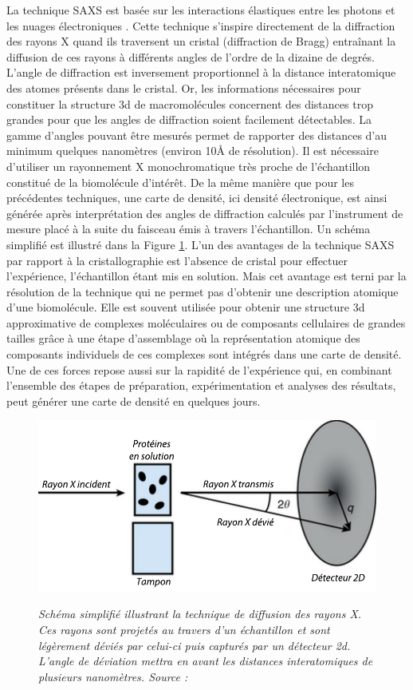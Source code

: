 La technique SAXS est basée sur les interactions élastiques entre les photons et les nuages électroniques \cite{guimer1955small}. Cette technique s'inspire directement de la diffraction des rayons X quand ils traversent un cristal (diffraction de Bragg) entraînant la diffusion de ces rayons à différents angles de l'ordre de la dizaine de degrés. L'angle de diffraction est inversement proportionnel à la distance interatomique des atomes présents dans le cristal. Or, les informations nécessaires pour constituer la structure 3d de macromolécules concernent des distances trop grandes pour que les angles de diffraction soient facilement détectables. La gamme d'angles pouvant être mesurés permet de rapporter des distances d'au minimum quelques nanomètres (environ 10\r{A} de résolution). Il est nécessaire d'utiliser un rayonnement X monochromatique très proche de l'échantillon constitué de la biomolécule d'intérêt. De la même manière que pour les précédentes techniques, une carte de densité, ici densité électronique, est ainsi générée après interprétation des angles de diffraction calculés par l'instrument de mesure placé à la suite du faisceau émis à travers l'échantillon. Un schéma simplifié est illustré dans la Figure \ref{Fig:saxs}.
L'un des avantages de la technique SAXS par rapport à la cristallographie est l'absence de cristal pour effectuer l'expérience, l'échantillon étant mis en solution. Mais cet avantage est terni par la résolution de la technique qui ne permet pas d'obtenir une description atomique d'une biomolécule. Elle est souvent utilisée pour obtenir une structure 3d approximative de complexes moléculaires ou de composants cellulaires de grandes tailles grâce à une étape d'assemblage où la représentation atomique des composants individuels de ces complexes sont intégrés dans une carte de densité. Une de ces forces repose aussi sur la rapidité de l'expérience qui, en combinant l'ensemble des étapes de préparation, expérimentation et analyses des résultats, peut générer une carte de densité en quelques jours.

\begin{figure}[htb]
  \centering
  {\includegraphics[width=0.75\linewidth]{./figures/ch1/saxs.pdf}}
    \caption[Schéma de la technique de diffusion des rayons X - SAXS.]{\it Schéma simplifié illustrant la technique de diffusion des rayons X. Ces rayons sont projetés au travers d'un échantillon et sont légèrement déviés par celui-ci puis capturés par un détecteur 2d. L'angle de déviation mettra en avant les distances interatomiques de plusieurs nanomètres. Source : \cite{skou2014synchrotron}}
    \label{Fig:saxs}
\end{figure}

